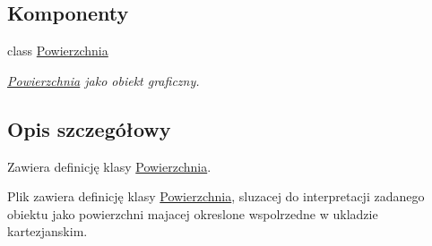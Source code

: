 \subsection*{Komponenty}
\begin{DoxyCompactItemize}
\item 
class \hyperlink{classPowierzchnia}{Powierzchnia}
\begin{DoxyCompactList}\small\item\em \hyperlink{classPowierzchnia}{Powierzchnia} jako obiekt graficzny. \end{DoxyCompactList}\end{DoxyCompactItemize}


\subsection{Opis szczegółowy}
Zawiera definicję klasy \hyperlink{classPowierzchnia}{Powierzchnia}. 

Plik zawiera definicję klasy \hyperlink{classPowierzchnia}{Powierzchnia}, sluzacej do interpretacji zadanego obiektu jako powierzchni majacej okreslone wspolrzedne w ukladzie kartezjanskim. 
